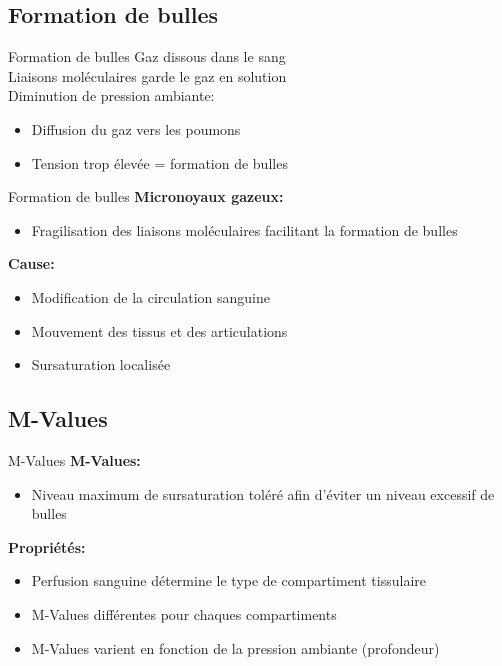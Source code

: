 \subsection{Formation de bulles}

\begin{frame}{Formation de bulles}  
	Gaz dissous dans le sang\\
	Liaisons moléculaires garde le gaz en solution\\
	Diminution de pression ambiante:
	\begin{itemize}
		\item Diffusion du gaz vers les poumons
		\item Tension trop élevée = formation de bulles
	\end{itemize}
\end{frame}

\begin{frame}{Formation de bulles}
	\textbf{Micronoyaux gazeux:}
	\begin{itemize}
		\item Fragilisation des liaisons moléculaires facilitant la formation de bulles
	\end{itemize}
	\vfill
	\textbf{Cause:}
	\begin{itemize}
		\item Modification de la circulation sanguine
		\item Mouvement des tissus et des articulations
		\item Sursaturation localisée
	\end{itemize}
\end{frame}

\subsection{M-Values}

\begin{frame}{M-Values}  
	\textbf{M-Values:}
	\begin{itemize}
		\item Niveau maximum de sursaturation toléré afin d'éviter un niveau excessif de bulles
	\end{itemize}
	\vfill
	\textbf{Propriétés:}
	\begin{itemize}
		\item Perfusion sanguine détermine le type de compartiment tissulaire
		\item M-Values différentes pour chaques compartiments
		\item M-Values varient en fonction de la pression ambiante (profondeur)
	\end{itemize}
\end{frame}

